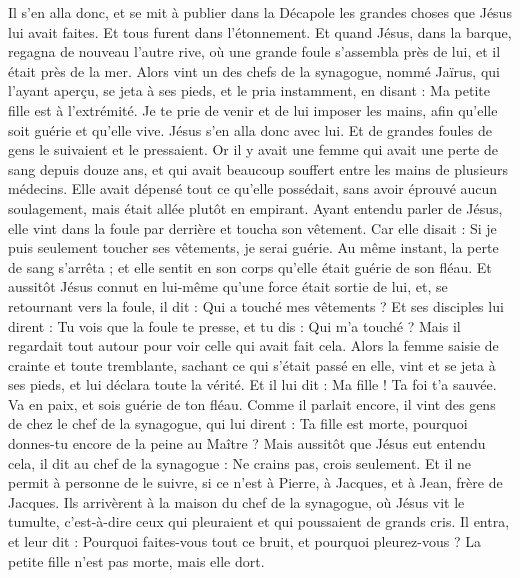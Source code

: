 \begin{multicols}{2}
Il s'en alla donc, et se mit à publier dans la Décapole les grandes choses que Jésus lui avait faites. Et tous furent dans l’étonnement.
Et quand Jésus, dans la barque, regagna de nouveau l’autre rive, où une grande foule s’assembla près de lui, et il était près de la mer.
Alors vint un des chefs de la synagogue, nommé Jaïrus, qui l’ayant aperçu, se jeta à ses pieds,
et le pria instamment, en disant : Ma petite fille est à l'extrémité. Je te prie de venir et de lui imposer les mains, afin qu'elle soit guérie et qu'elle vive.
Jésus s'en alla donc avec lui. Et de grandes foules de gens le suivaient et le pressaient.
Or il y avait une femme qui avait une perte de sang depuis douze ans,
et qui avait beaucoup souffert entre les mains de plusieurs médecins. Elle avait dépensé tout ce qu’elle possédait, sans avoir éprouvé aucun soulagement, mais était allée plutôt en empirant.
Ayant entendu parler de Jésus, elle vint dans la foule par derrière et toucha son vêtement.
Car elle disait : Si je puis seulement toucher ses vêtements, je serai guérie.
Au même instant, la perte de sang s'arrêta ; et elle sentit en son corps qu'elle était guérie de son fléau.
Et aussitôt Jésus connut en lui-même qu’une force était sortie de lui, et, se retournant vers la foule, il dit : Qui a touché mes vêtements ?
Et ses disciples lui dirent : Tu vois que la foule te presse, et tu dis : Qui m'a touché ?
Mais il regardait tout autour pour voir celle qui avait fait cela.
Alors la femme saisie de crainte et toute tremblante, sachant ce qui s’était passé en elle, vint et se jeta à ses pieds, et lui déclara toute la vérité.
Et il lui dit : Ma fille ! Ta foi t'a sauvée. Va en paix, et sois guérie de ton fléau.
Comme il parlait encore, il vint des gens de chez le chef de la synagogue, qui lui dirent : Ta fille est morte, pourquoi donnes-tu encore de la peine au Maître ?
Mais aussitôt que Jésus eut entendu cela, il dit au chef de la synagogue : Ne crains pas, crois seulement.
Et il ne permit à personne de le suivre, si ce n’est à Pierre, à Jacques, et à Jean, frère de Jacques.
Ils arrivèrent à la maison du chef de la synagogue, où Jésus vit le tumulte, c'est-à-dire ceux qui pleuraient et qui poussaient de grands cris.
Il entra, et leur dit : Pourquoi faites-vous tout ce bruit, et pourquoi pleurez-vous ? La petite fille n'est pas morte, mais elle dort.

\end{multicols}
